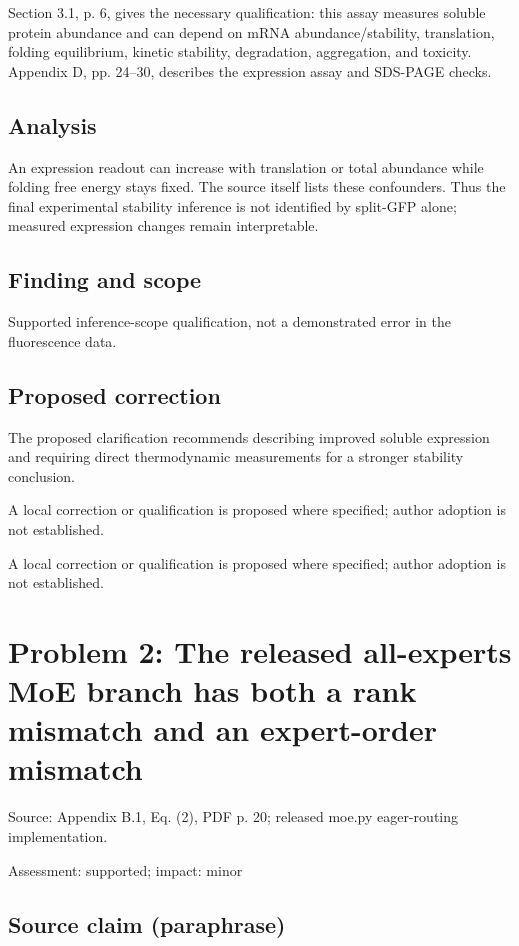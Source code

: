 \documentclass[11pt]{article}
\begin{document}
Section 3.1, p. 6, gives the necessary qualification: this assay measures soluble protein abundance and can depend on mRNA abundance/stability, translation, folding equilibrium, kinetic stability, degradation, aggregation, and toxicity. Appendix D, pp. 24–30, describes the expression assay and SDS-PAGE checks.

\subsection*{Analysis}

An expression readout can increase with translation or total abundance while folding free energy stays fixed. The source itself lists these confounders. Thus the final experimental stability inference is not identified by split-GFP alone; measured expression changes remain interpretable.

\subsection*{Finding and scope}

Supported inference-scope qualification, not a demonstrated error in the fluorescence data.

\subsection*{Proposed correction}

The proposed clarification recommends describing improved soluble expression and requiring direct thermodynamic measurements for a stronger stability conclusion.

A local correction or qualification is proposed where specified; author adoption is not established.

A local correction or qualification is proposed where specified; author adoption is not established.

\section*{Problem 2: The released all-experts MoE branch has both a rank mismatch and an expert-order mismatch}

Source: Appendix B.1, Eq. (2), PDF p. 20; released moe.py eager-routing implementation.

Assessment: supported; impact: minor

\subsection*{Source claim (paraphrase)}
\end{document}
